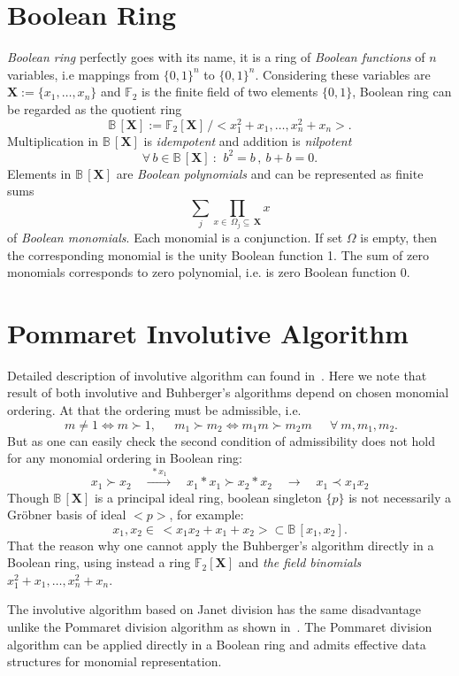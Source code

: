 \documentclass[12pt]{article}
\newcommand{\Gr}{Gr\"obner }
\newcommand{\B}{\mathbb{B\,}}
\newcommand{\F}{\mathbb{F}}
\begin{document}
\section{Boolean Ring}

{\em Boolean ring} perfectly goes with its name, it is a ring of {\em Boolean functions} of $n$ variables, i.e
mappings from $\{0,1\}^n$ to $\{0,1\}^n$. Considering these variables are $\mathbf{X}:=\{x_1,\ldots,x_n\}$ and
$\F_2$ is the finite field of two elements $\{0,1\}$, Boolean ring can be regarded as the quotient ring
$$
\B[\mathbf{X}]:=\F_2[\mathbf{X}]\,/<x_1^2+x_1,\ldots,x_n^2+x_n>.
$$
Multiplication in $\B[\mathbf{X}]$ is {\em idempotent} and addition is {\em nilpotent}
$$
\forall\, b\in \B[\mathbf{X}]\ :\ \,b^2=b\,,\ b+b=0.
$$
Elements in $\B[\mathbf{X}]$ are {\em Boolean polynomials} and can be represented as finite sums
$$
\sum_j \prod_{x\in\, \Omega_j \subseteq\, \mathbf{X}} x
$$
of {\em Boolean monomials}. Each monomial is a conjunction. If set $\Omega$ is empty, then the corresponding
monomial is the unity Boolean function 1. The sum of zero monomials corresponds to zero polynomial, i.e. is
zero Boolean function 0.

\section{Pommaret Involutive Algorithm}

Detailed description of involutive algorithm can found in~\cite{Gerdt'05}. Here we note that result of both
involutive and Buhberger's algorithms depend on chosen monomial ordering. At that the ordering must be
admissible, i.e.
$$
\ m \neq 1 \Longleftrightarrow m \succ 1, \quad \ \ m_1 \succ m_2 \Longleftrightarrow m_1 m \succ m_2 m
\quad \ \ \forall \ m, m_1, m_2.
$$
But as one can easily check the second condition of admissibility does not hold for any monomial ordering
in Boolean ring:
$$
x_1\succ x_2\quad \xrightarrow{\ \ *x_1\ \ }\quad x_1*x_1\succ x_2*x_2\quad \xrightarrow{\ \ \ \ \ }\quad x_1 \prec x_1x_2
$$
Though $\B[\mathbf{X}]$ is a principal ideal ring, boolean singleton $\{p\}$ is not necessarily a \Gr basis of
ideal $<p>$, for example:
$$
x_1,x_2\in \,<x_1x_2 + x_1 + x_2> \subset \B[x_1, x_2].
$$
That the reason why one cannot apply the Buhberger's algorithm directly in a Boolean ring, using instead a ring
$\F_2[\mathbf{X}]$ and {\em the field binomials} $x_1^2+x_1,\ldots,x_n^2+x_n$.

The involutive algorithm based on Janet division has the same disadvantage unlike the Pommaret division algorithm as shown 
in~\cite{ISSAC'08}. The Pommaret division  algorithm can be applied directly in a Boolean ring and admits effective data 
structures for monomial representation.
\end{document}
